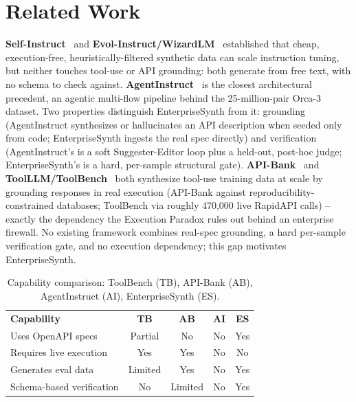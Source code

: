 \documentclass[letterpaper]{article} %
\begin{document}
\section{Related Work}
\textbf{Self-Instruct}~\cite{wang2022selfinstruct} and \textbf{Evol-Instruct/WizardLM}~\cite{xu2023wizardlm}
established that cheap, execution-free, heuristically-filtered synthetic data can scale instruction
tuning, but neither touches tool-use or API grounding: both generate from free text, with no schema
to check against. \textbf{AgentInstruct}~\cite{mitra2024agentinstruct} is the closest architectural
precedent, an agentic multi-flow pipeline behind the 25-million-pair Orca-3 dataset. Two properties
distinguish EnterpriseSynth from it: grounding (AgentInstruct synthesizes or hallucinates an API
description when seeded only from code; EnterpriseSynth ingests the real spec directly) and
verification (AgentInstruct's is a soft Suggester-Editor loop plus a held-out, post-hoc judge;
EnterpriseSynth's is a hard, per-sample structural gate). \textbf{API-Bank}~\cite{li2023apibank}
and \textbf{ToolLLM/ToolBench}~\cite{qin2023toolbench} both synthesize tool-use training data at
scale by grounding responses in real execution (API-Bank against reproducibility-constrained
databases; ToolBench via roughly 470,000 live RapidAPI calls) -- exactly the dependency the
Execution Paradox rules out behind an enterprise firewall. No existing framework combines
real-spec grounding, a hard per-sample verification gate, and no execution dependency; this gap
motivates EnterpriseSynth.

\begin{table}[t]
\centering
\footnotesize
\setlength{\tabcolsep}{2pt}
\begin{tabular}{lcccc}
\textbf{Capability} & \textbf{TB} & \textbf{AB} & \textbf{AI} & \textbf{ES} \\
Uses OpenAPI specs & Partial & No & No & Yes \\
Requires live execution & Yes & Yes & No & No \\
Generates eval data & Limited & Yes & No & Yes \\
Schema-based verification & No & Limited & No & Yes \\
\end{tabular}
\caption{Capability comparison: ToolBench (TB), API-Bank (AB), AgentInstruct (AI), EnterpriseSynth (ES).}
\label{tab:comparison}
\end{table}
\end{document}
